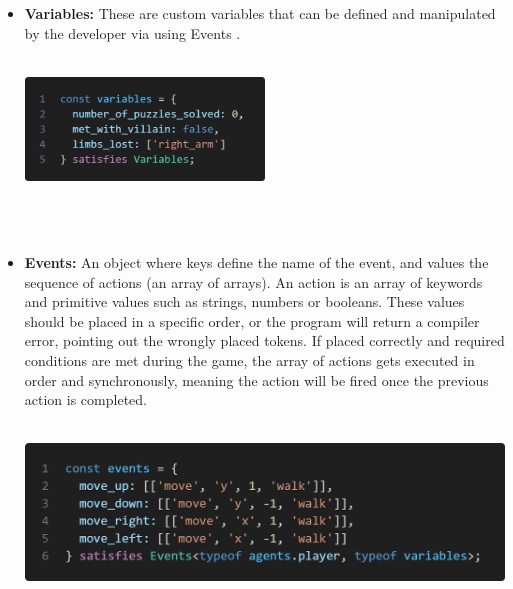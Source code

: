 \documentclass{article}
\begin{document}
\begin{itemize}
    \item \textbf{Variables:} These are custom variables that can be defined and manipulated by the developer via using Events .\\\\
    \begin{minipage}{\linewidth}
        \centering
        \includegraphics[width=0.5\textwidth]{variables.png}
    \end{minipage}\\\\
    
    \item \textbf{Events:} An object where keys define the name of the event, and values the sequence of actions (an array of arrays). An action is an array of keywords and primitive values such as strings, numbers or booleans. These values should be placed in a specific order, or the program will return a compiler error, pointing out the wrongly placed tokens. If placed correctly and required conditions are met during the game, the array of actions gets executed in order and synchronously, meaning the action will be fired once the previous action is completed.\\\\ 
        \begin{minipage}{\linewidth}
        \centering
        \includegraphics[width=1\textwidth]{events.png}
    \end{minipage}\\\\
    

\end{itemize}
\end{document}
